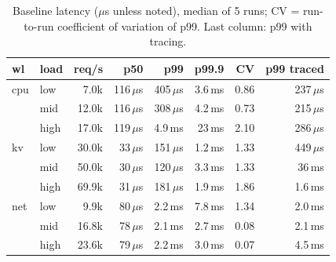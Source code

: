 \begin{table}[t]\centering\caption{Baseline latency ($\mu$s unless noted), median of 5 runs; CV = run-to-run coefficient of variation of p99. Last column: p99 with \sys{} tracing.}\label{tab:latency}\footnotesize\setlength{\tabcolsep}{3.2pt}
\begin{tabular}{llrrrrrr}\toprule
wl & load & req/s & p50 & p99 & p99.9 & CV & p99 traced\\\midrule
cpu & low & 7.0k & 116\,$\mu$s & 405\,$\mu$s & 3.6\,ms & 0.86 & 237\,$\mu$s \\
 & mid & 12.0k & 116\,$\mu$s & 308\,$\mu$s & 4.2\,ms & 0.73 & 215\,$\mu$s \\
 & high & 17.0k & 119\,$\mu$s & 4.9\,ms & 23\,ms & 2.10 & 286\,$\mu$s \\
\midrule
kv & low & 30.0k & 33\,$\mu$s & 151\,$\mu$s & 1.2\,ms & 1.33 & 449\,$\mu$s \\
 & mid & 50.0k & 30\,$\mu$s & 120\,$\mu$s & 3.3\,ms & 1.33 & 36\,ms \\
 & high & 69.9k & 31\,$\mu$s & 181\,$\mu$s & 1.9\,ms & 1.86 & 1.6\,ms \\
\midrule
net & low & 9.9k & 80\,$\mu$s & 2.2\,ms & 7.8\,ms & 1.34 & 2.0\,ms \\
 & mid & 16.8k & 78\,$\mu$s & 2.1\,ms & 2.7\,ms & 0.08 & 2.1\,ms \\
 & high & 23.6k & 79\,$\mu$s & 2.2\,ms & 3.0\,ms & 0.07 & 4.5\,ms \\
\bottomrule\end{tabular}\end{table}
